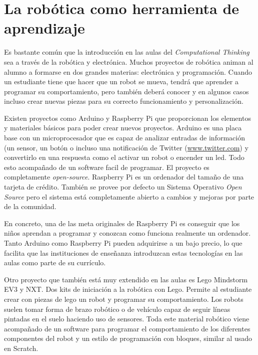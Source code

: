 \section{La robótica como herramienta de aprendizaje}
\label{sec:electronica-robotica}


Es bastante común que la introducción en las aulas del \emph{Computational Thinking} sea a través de la robótica y electrónica. Muchos proyectos de robótica animan al alumno a formarse en dos grandes materias: electrónica y programación. Cuando un estudiante tiene que hacer que un robot se mueva, tendrá que aprender a programar su comportamiento, pero también deberá conocer y en algunos casos incluso crear nuevas piezas para su correcto funcionamiento y personalización.

Existen proyectos como Arduino\cite{arduino} y Raspberry Pi\cite{raspberry-pi} que proporcionan los elementos y materiales básicos para poder crear nuevos proyectos. Arduino es una placa base con un microprocesador que es capaz de analizar entradas de información (un sensor, un botón o incluso una notificación de Twitter (\url{www.twitter.com}) y convertirlo en una respuesta como el activar un robot o encender un led. Todo esto acompañado de un software facil de programar. El proyecto es completamente \emph{\gls{open-source}}. Raspberry Pi es un ordenador del tamaño de una tarjeta de crédito. También se provee por defecto un Sistema Operativo \emph{Open Source} pero el sistema está completamente abierto a cambios y mejoras por parte de la comunidad. 


En concreto, una de las meta originales de Raspberry Pi es conseguir que los niños aprendan a programar y conozcan como funciona realmente un ordenador. Tanto Arduino como Raspberry Pi pueden adquirirse a un bajo precio, lo que facilita que las instituciones de enseñanza introduzcan estas tecnologías en las aulas como parte de su currículo.


Otro proyecto que también está muy extendido en las aulas es Lego Mindstorm EV3 y NXT\cite{lego-mindstorm}. Dos kits de iniciación a la robótica con Lego. Permite al estudiante crear con piezas de lego un robot y programar su comportamiento. Los robots suelen tomar forma de brazo robótico o de vehículo capaz de seguir líneas pintadas en el suelo haciendo uso de sensores. Toda este material robótico viene acompañado de un software para programar el comportamiento de los diferentes componentes del robot y un estilo de programación con bloques\cite{lego-mindstorm-programar}, similar al usado en Scratch.

